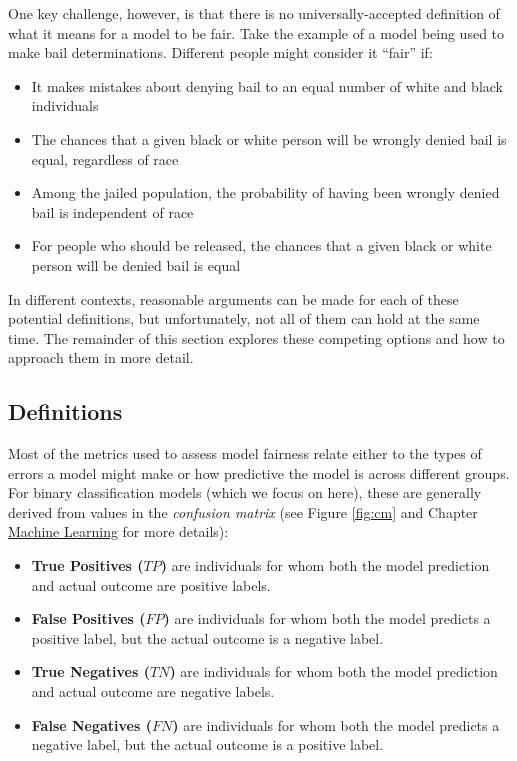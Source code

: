 \documentclass[]{krantz}
\begin{document}
One key challenge, however, is that there is no universally-accepted
definition of what it means for a model to be fair. Take the example of
a model being used to make bail determinations. Different people might
consider it ``fair'' if:

\begin{itemize}
\item
  It makes mistakes about denying bail to an equal number of white and
  black individuals
\item
  The chances that a given black or white person will be wrongly denied
  bail is equal, regardless of race
\item
  Among the jailed population, the probability of having been wrongly
  denied bail is independent of race
\item
  For people who should be released, the chances that a given black or
  white person will be denied bail is equal
\end{itemize}

In different contexts, reasonable arguments can be made for each of
these potential definitions, but unfortunately, not all of them can hold
at the same time. The remainder of this section explores these competing
options and how to approach them in more detail.

\subsection{Definitions}\label{definitions}

Most of the metrics used to assess model fairness relate either to the
types of errors a model might make or how predictive the model is across
different groups. For binary classification models (which we focus on
here), these are generally derived from values in the \emph{confusion
matrix} (see Figure \ref{fig:cm} and Chapter
\protect\hyperlink{chap:ml}{Machine Learning} for more details):

\begin{itemize}
\item
  \textbf{True Positives (\(TP\))} are individuals for whom both the
  model prediction and actual outcome are positive labels.
\item
  \textbf{False Positives (\(FP\))} are individuals for whom both the
  model predicts a positive label, but the actual outcome is a negative
  label.
\item
  \textbf{True Negatives (\(TN\))} are individuals for whom both the
  model prediction and actual outcome are negative labels.
\item
  \textbf{False Negatives (\(FN\))} are individuals for whom both the
  model predicts a negative label, but the actual outcome is a positive
  label.
\end{itemize}
\end{document}
